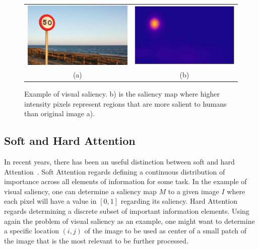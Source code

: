 \documentclass[English]{style/ic-tese-v3}
\begin{document}
\begin{figure}
\begin{center}
		\begin{tabular} {cc}
		\includegraphics[width=0.40\linewidth]{./img/traffic_sign_s.jpg} &
		\includegraphics[width=0.40\linewidth]{./img/traffic_sign_m.jpg}\\
        (a) & (b)
		\end{tabular}
\caption{Example of visual saliency.
    b) is the saliency map where higher intensity pixels represent
    regions that are more salient to humans than original image a).}
\label{fig:saliency}
\end{center}
\end{figure}

\subsection{Soft and Hard Attention}
In recent years, there has been an useful distinction between
soft and hard Attention~\cite{ref:att-survey}.
Soft Attention regards defining a continuous distribution of importance
across all elements of information for some task.
In the example of visual saliency, one can determine a saliency map $M$
to a given image $I$ where each pixel will have a value in $[0, 1]$
regarding its saliency.
Hard Attention regards determining a discrete subset of
important information elements.
Using again the problem of visual saliency as an example,
one might want to determine a specific location $(i, j)$ of the image
to be used as center of a small patch of the image that is the most
relevant to be further processed.
\end{document}
